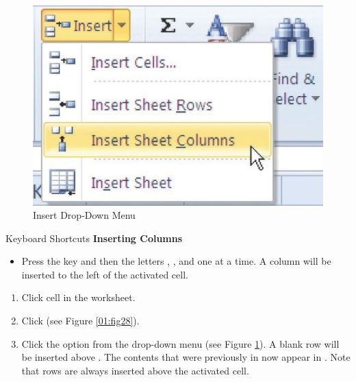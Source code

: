 \begin{figure}[H]
	\centering
	\includegraphics[width=\maxwidth{.95\linewidth}]{gfx/ch01_fig29}
	\caption{Insert Drop-Down Menu}
	\label{01:fig29}
\end{figure}

\begin{center}
	\begin{shtcutbox}{Keyboard Shortcuts}
		\textbf{Inserting Columns}
		\\
		\begin{itemize}
			\setlength{\itemsep}{0pt}
			\setlength{\parskip}{0pt}
			\setlength{\parsep}{0pt}
			
			\item Press the  key and then the letters , , and  one at a time. A column will be inserted to the left of the activated cell.
			
		\end{itemize}
	\end{shtcutbox}
\end{center}

\begin{enumbox}
	\begin{enumerate}
		\item Click cell  in the  worksheet.
		\item Click  (see Figure \ref{01:fig28}).
		\item Click the  option from the drop-down menu (see Figure \ref{01:fig29}). A blank row will be inserted above . The contents that were previously in  now appear in . Note that rows are always inserted above the activated cell.
	\end{enumerate}
\end{enumbox}

